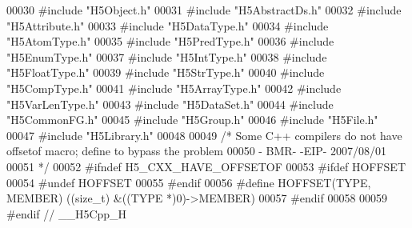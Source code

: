 \begin{DoxyCode}
00030 \textcolor{preprocessor}{#include "H5Object.h"}
00031 \textcolor{preprocessor}{#include "H5AbstractDs.h"}
00032 \textcolor{preprocessor}{#include "H5Attribute.h"}
00033 \textcolor{preprocessor}{#include "H5DataType.h"}
00034 \textcolor{preprocessor}{#include "H5AtomType.h"}
00035 \textcolor{preprocessor}{#include "H5PredType.h"}
00036 \textcolor{preprocessor}{#include "H5EnumType.h"}
00037 \textcolor{preprocessor}{#include "H5IntType.h"}
00038 \textcolor{preprocessor}{#include "H5FloatType.h"}
00039 \textcolor{preprocessor}{#include "H5StrType.h"}
00040 \textcolor{preprocessor}{#include "H5CompType.h"}
00041 \textcolor{preprocessor}{#include "H5ArrayType.h"}
00042 \textcolor{preprocessor}{#include "H5VarLenType.h"}
00043 \textcolor{preprocessor}{#include "H5DataSet.h"}
00044 \textcolor{preprocessor}{#include "H5CommonFG.h"}
00045 \textcolor{preprocessor}{#include "H5Group.h"}
00046 \textcolor{preprocessor}{#include "H5File.h"}
00047 \textcolor{preprocessor}{#include "H5Library.h"}
00048 
00049 \textcolor{comment}{/* Some C++ compilers do not have offsetof macro; define to bypass the problem}
00050 \textcolor{comment}{   - BMR- -EIP- 2007/08/01}
00051 \textcolor{comment}{*/}
00052 \textcolor{preprocessor}{#ifndef H5\_CXX\_HAVE\_OFFSETOF}
00053 \textcolor{preprocessor}{#ifdef HOFFSET}
00054 \textcolor{preprocessor}{   #undef HOFFSET}
00055 \textcolor{preprocessor}{#endif}
00056 \textcolor{preprocessor}{#define HOFFSET(TYPE, MEMBER) ((size\_t) &((TYPE *)0)->MEMBER)}
00057 \textcolor{preprocessor}{#endif}
00058 
00059 \textcolor{preprocessor}{#endif // \_\_H5Cpp\_H}
\end{DoxyCode}
